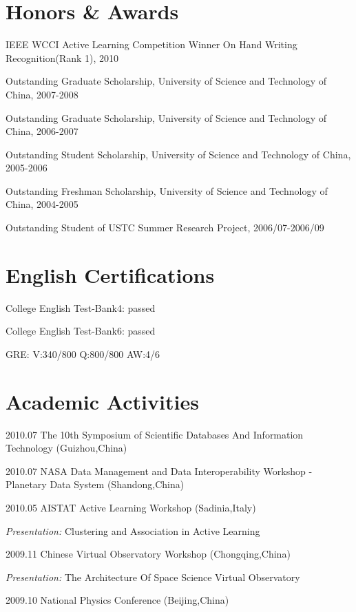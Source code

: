\documentclass[10pt,letterpaper]{article}
\renewenvironment{itemize}{
  \begin{list}{}{
    \setlength{\leftmargin}{1.5em}
    \setlength{\itemsep}{0.25em}
    \setlength{\parskip}{0pt}
    \setlength{\parsep}{0.25em}
  }
}{
  \end{list}
}
\begin{document}
\section*{Honors \& Awards}
\begin{itemize}
  \item IEEE WCCI  Active Learning Competition Winner On Hand Writing Recognition(Rank 1), 2010
  \item Outstanding Graduate Scholarship, University of Science and Technology of China, 2007-2008 
  \item Outstanding Graduate Scholarship, University of Science and Technology of China, 2006-2007
  \item Outstanding Student Scholarship, University of Science and Technology of China, 2005-2006
  \item Outstanding Freshman Scholarship, University of Science and Technology of China, 2004-2005
  \item Outstanding Student of USTC Summer Research Project, 2006/07-2006/09
\end{itemize}

\section*{English Certifications}
\begin{itemize}
  \item College English Test-Bank4: passed
  \item College English Test-Bank6: passed
  \item GRE: V:340/800 Q:800/800 AW:4/6
\end{itemize}

\section*{Academic Activities}
\begin{itemize}
  \item  2010.07 The 10th Symposium of Scientific Databases And Information Technology (Guizhou,China)
  \item  2010.07 NASA Data Management and Data Interoperability Workshop - Planetary Data System (Shandong,China)
  \item  2010.05 AISTAT Active Learning Workshop (Sadinia,Italy)
	\begin{itemize}
		\item \textit{Presentation:} Clustering and Association in Active Learning
	\end{itemize}
  \item  2009.11 Chinese Virtual Observatory Workshop (Chongqing,China)
	\begin{itemize}
		\item \textit{Presentation:} The Architecture Of Space Science Virtual Observatory
	\end{itemize}
  \item  2009.10 National Physics Conference (Beijing,China)
\end{itemize}
\end{document}
